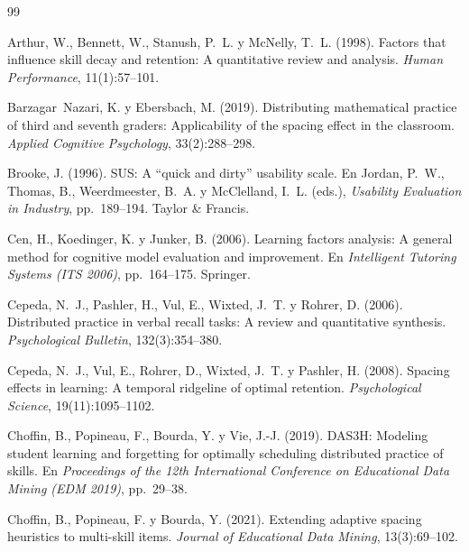 \documentclass[12pt]{article}
\theoremstyle{definition}
\begin{document}
\begin{thebibliography}{99}
\small

Arthur, W., Bennett, W., Stanush, P.~L. y McNelly, T.~L. (1998).
\newblock Factors that influence skill decay and retention: A quantitative review and analysis.
\newblock \emph{Human Performance}, 11(1):57--101.

Barzagar~Nazari, K. y Ebersbach, M. (2019).
\newblock Distributing mathematical practice of third and seventh graders: Applicability of the spacing effect in the classroom.
\newblock \emph{Applied Cognitive Psychology}, 33(2):288--298.

Brooke, J. (1996).
\newblock SUS: A ``quick and dirty'' usability scale.
\newblock En Jordan, P.~W., Thomas, B., Weerdmeester, B.~A. y McClelland, I.~L. (eds.), \emph{Usability Evaluation in Industry}, pp.~189--194. Taylor \& Francis.

Cen, H., Koedinger, K. y Junker, B. (2006).
\newblock Learning factors analysis: A general method for cognitive model evaluation and improvement.
\newblock En \emph{Intelligent Tutoring Systems (ITS 2006)}, pp.~164--175. Springer.

Cepeda, N.~J., Pashler, H., Vul, E., Wixted, J.~T. y Rohrer, D. (2006).
\newblock Distributed practice in verbal recall tasks: A review and quantitative synthesis.
\newblock \emph{Psychological Bulletin}, 132(3):354--380.

Cepeda, N.~J., Vul, E., Rohrer, D., Wixted, J.~T. y Pashler, H. (2008).
\newblock Spacing effects in learning: A temporal ridgeline of optimal retention.
\newblock \emph{Psychological Science}, 19(11):1095--1102.

Choffin, B., Popineau, F., Bourda, Y. y Vie, J.-J. (2019).
\newblock DAS3H: Modeling student learning and forgetting for optimally scheduling distributed practice of skills.
\newblock En \emph{Proceedings of the 12th International Conference on Educational Data Mining (EDM 2019)}, pp.~29--38.

Choffin, B., Popineau, F. y Bourda, Y. (2021).
\newblock Extending adaptive spacing heuristics to multi-skill items.
\newblock \emph{Journal of Educational Data Mining}, 13(3):69--102.


\end{thebibliography}
\end{document}
